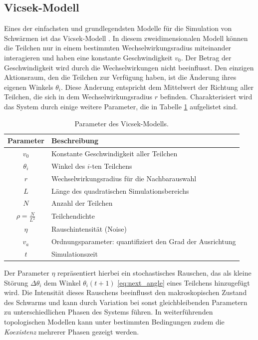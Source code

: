 \documentclass{solutionclass}
\begin{document}
\subsection{Vicsek-Modell}
Eines der einfachsten und grundlegendsten Modelle für die Simulation von Schwärmen ist das Vicsek-Modell \cite{vicsek1995}. In diesem zweidimensionalen Modell können die Teilchen nur in einem bestimmten Wechselwirkungsradius miteinander interagieren und haben eine konstante Geschwindigkeit $v_0$. Der Betrag der Geschwindigkeit wird durch die Wechselwirkungen nicht beeinflusst.
Den einzigen Aktionsraum, den die Teilchen zur Verfügung haben, ist die Änderung ihres eigenen Winkels
$\theta_i$. Diese Änderung entspricht dem Mittelwert der Richtung aller Teilchen, die sich in dem Wechselwirkungsradius $r$ befinden. Charakterisiert wird das System durch einige weitere Parameter, die in Tabelle \ref{table:vicsek_parameters} aufgelistet sind.

\begin{table}[h]
    \centering
    \caption{Parameter des Vicsek-Modells.}
    \label{table:vicsek_parameters}
    \begin{tabular}{|c|l|}
        \hline
        \textbf{Parameter} & \textbf{Beschreibung} \\
        \hline
        \(v_0\) & Konstante Geschwindigkeit aller Teilchen \\
        \(\theta_i\) & Winkel des \(i\)-ten Teilchens \\
        \(r\) & Wechselwirkungsradius für die Nachbarauswahl \\
        \(L\) & Länge des quadratischen Simulationsbereichs \\
        \(N\) & Anzahl der Teilchen \\
        \(\rho = \frac{N}{L^2}\) & Teilchendichte \\
        \(\eta\) & Rauschintensität (Noise) \\
        \(v_a\) & Ordnungsparameter: quantifiziert den Grad der Ausrichtung \\
        $t$ & Simulationszeit \\
        \hline
    \end{tabular}
\end{table} 

Der Parameter $\eta$ repräsentiert hierbei ein stochastisches Rauschen, das als kleine Störung $\Delta \theta_i$ dem Winkel $\theta_i(t+1)$ \eqref{eq:next_angle} eines Teilchens hinzugefügt wird. Die Intensität dieses Rauschens beeinflusst den makroskopischen Zustand des Schwarms und kann durch Variation bei sonst gleichbleibenden Parametern zu unterschiedlichen Phasen des Systems führen. In weiterführenden topologischen Modellen kann unter bestimmten Bedingungen zudem die \textit{Koexistenz} mehrerer Phasen gezeigt werden.
\end{document}
